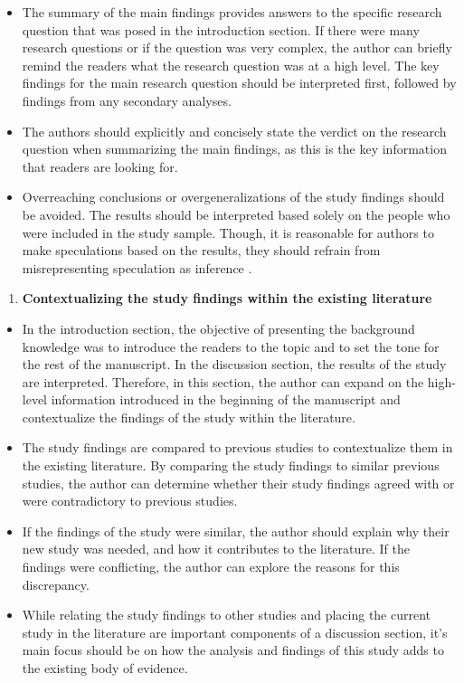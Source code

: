 \documentclass[
]{book}
\providecommand{\tightlist}{%
  \setlength{\itemsep}{0pt}\setlength{\parskip}{0pt}}
\begin{document}
\begin{itemize}
\tightlist
\item
  The summary of the main findings provides answers to the specific research question that was posed in the introduction section. If there were many research questions or if the question was very complex, the author can briefly remind the readers what the research question was at a high level. The key findings for the main research question should be interpreted first, followed by findings from any secondary analyses.
\item
  The authors should explicitly and concisely state the verdict on the research question when summarizing the main findings, as this is the key information that readers are looking for.
\item
  Overreaching conclusions or overgeneralizations of the study findings should be avoided. The results should be interpreted based solely on the people who were included in the study sample. Though, it is reasonable for authors to make speculations based on the results, they should refrain from misrepresenting speculation as inference \citep[p.120-125]{heard2016scientist}.
\end{itemize}

\begin{enumerate}
\def\labelenumi{\arabic{enumi}.}
\setcounter{enumi}{1}
\tightlist
\item
  \textbf{Contextualizing the study findings within the existing literature}
\end{enumerate}

\begin{itemize}
\tightlist
\item
  In the introduction section, the objective of presenting the background knowledge was to introduce the readers to the topic and to set the tone for the rest of the manuscript. In the discussion section, the results of the study are interpreted. Therefore, in this section, the author can expand on the high-level information introduced in the beginning of the manuscript and contextualize the findings of the study within the literature.
\item
  The study findings are compared to previous studies to contextualize them in the existing literature. By comparing the study findings to similar previous studies, the author can determine whether their study findings agreed with or were contradictory to previous studies.
\item
  If the findings of the study were similar, the author should explain why their new study was needed, and how it contributes to the literature. If the findings were conflicting, the author can explore the reasons for this discrepancy.
\item
  While relating the study findings to other studies and placing the current study in the literature are important components of a discussion section, it's main focus should be on how the analysis and findings of this study adds to the existing body of evidence.
\end{itemize}
\end{document}
